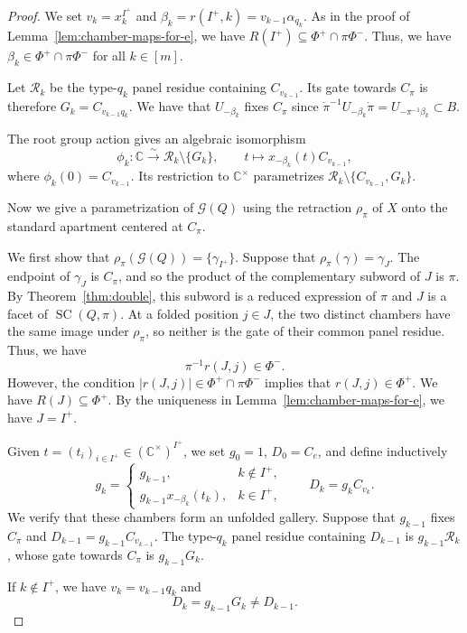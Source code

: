 \documentclass[11pt,a4paper]{article}
\theoremstyle{definition}
\theoremstyle{remark}
\numberwithin{equation}{section}
\newcommand{\SCQ}{\operatorname{SC}(Q,\pi)}
\newcommand{\C}{\mathbb C}
\begin{document}
\begin{proof}
We set $v_k=x_k^{I^+}$ and $\beta_k=r(I^+,k)=v_{k-1}\alpha_{q_k}$.
As in the proof of Lemma~\ref{lem:chamber-maps-for-e}, we have $R(I^+)\subseteq \Phi^+\cap\pi\Phi^-$. Thus, we have $\beta_k\in \Phi^+\cap\pi\Phi^-$ for all $k\in[m]$.

Let $\mathcal R_k$ be the type-$q_k$ panel residue containing $C_{v_{k-1}}$. Its gate towards $C_\pi$ is therefore $G_k=C_{v_{k-1}q_k}$. We have that $U_{-\beta_k}$ fixes $C_\pi$ since $\dot\pi^{-1}U_{-\beta_k}\dot\pi
 =U_{-\pi^{-1}\beta_k}\subset B$.
 
The root group action gives an algebraic isomorphism
\[
 \phi_k:\mathbb C\xrightarrow{\sim}
 \mathcal R_k\setminus\{G_k\},
 \qquad t\longmapsto x_{-\beta_k}(t)C_{v_{k-1}},
\]
where $\phi_k(0)=C_{v_{k-1}}$. Its restriction to $\C^\times$ parametrizes $\mathcal R_k\setminus\{C_{v_{k-1}},G_k\}$.

Now we give a parametrization of $\mathcal G(Q)$ using the retraction $\rho_\pi$ of $X$ onto the standard apartment centered at $C_\pi$.

We first show that $\rho_{\pi}(\mathcal G(Q))=\{\gamma_{I^+}\}$.
Suppose that $\rho_\pi(\gamma)=\gamma_J$. The endpoint of $\gamma_J$ is $C_\pi$, and so the product of the complementary subword of $J$ is $\pi$. By Theorem~\ref{thm:double}, this subword is a reduced expression of $\pi$ and $J$ is
a facet of $\SCQ$. At a folded position $j\in J$, the two distinct chambers have the same image under $\rho_\pi$, so neither is the gate of their common panel residue. Thus, we have
\[
 \pi^{-1}r(J,j)\in\Phi^-.
\]
However, the condition $|r(J,j)|\in\Phi^+\cap\pi\Phi^-$ implies that $r(J,j)\in\Phi^+$. We have $R(J)\subseteq\Phi^+$. By the uniqueness in Lemma~\ref{lem:chamber-maps-for-e}, we have $J=I^+$.

Given $t=(t_i)_{i\in I^+}\in(\C^\times)^{I^+}$, we set $g_0=1$,
$D_0=C_e$, and define inductively
\[
 g_k=
 \begin{cases}
 g_{k-1},&k\notin I^+,\\
 g_{k-1}x_{-\beta_k}(t_k),&k\in I^+,
 \end{cases}
 \qquad D_k=g_kC_{v_k}.
\]
We verify that these chambers form an unfolded gallery.
Suppose that $g_{k-1}$ fixes $C_\pi$ and
$D_{k-1}=g_{k-1}C_{v_{k-1}}$. The type-$q_k$ panel residue
containing $D_{k-1}$ is $g_{k-1}\mathcal R_k$, whose gate
towards $C_\pi$ is $g_{k-1}G_k$.

If $k\notin I^+$, we have $v_k=v_{k-1}q_k$ and
\[
 D_k=g_{k-1}G_k\neq D_{k-1}.
\]


\end{proof}
\end{document}
